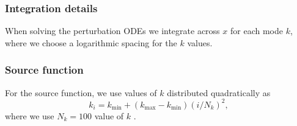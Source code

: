 \subsubsection{Integration details } \label{sssec:M3:implementations:integration_details}

When solving the perturbation ODEs we integrate across $x$ for each mode $k$, where we choose a logarithmic spacing for the $k$ values.   


\subsubsection{Source function} \label{sssec:M3:implementations:source_function}
For the source function, we use values of $k$ distributed quadratically  as 
\begin{equation} \label{eq:M3:implementations:k_distribution_for_source_function}
    k_i = k_\mathrm{min} + (k_\mathrm{max} - k_\mathrm{min})(i/N_k)^2,
\end{equation}
where we use $N_k=100$ value of $k$ .